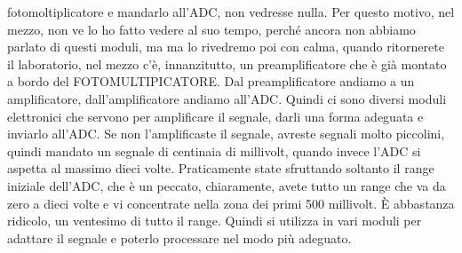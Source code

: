 fotomoltiplicatore e mandarlo all'ADC, non vedresse nulla. Per questo motivo, nel mezzo, non ve lo ho fatto vedere al suo tempo, perché ancora non abbiamo parlato di questi moduli, ma ma lo rivedremo poi con calma, quando ritornerete il laboratorio, nel mezzo c'è, innanzitutto, un preamplificatore che è già montato a bordo del FOTOMULTIPICATORE. Dal preamplificatore andiamo a un amplificatore, dall'amplificatore andiamo all'ADC. Quindi ci sono diversi moduli elettronici che servono per amplificare il segnale, darli una forma adeguata e inviarlo all'ADC. Se non l'amplificaste il segnale, avreste segnali molto piccolini, quindi mandato un segnale di centinaia di millivolt, quando invece l'ADC si aspetta al massimo dieci volte. Praticamente state sfruttando soltanto il range iniziale dell'ADC, che è un peccato, chiaramente, avete tutto un range che va da zero a dieci volte e vi concentrate nella zona dei primi 500 millivolt. È abbastanza ridicolo, un ventesimo di tutto il range. Quindi si utilizza in vari moduli per adattare il segnale e poterlo processare nel modo più adeguato. 

